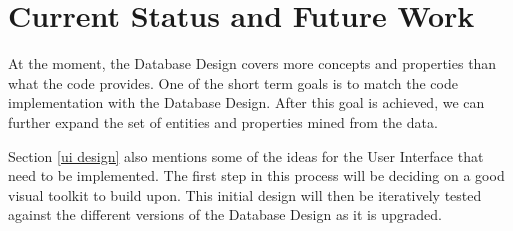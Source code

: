 \documentclass{sig-alternate}
\begin{document}
\section{Current Status and Future Work}
\label{current status}

At the moment, the Database Design covers more concepts and properties than what the code provides. One of the short
term goals is to match the code implementation with the Database Design. After this goal is achieved, we can further
expand the set of entities and properties mined from the data.

Section \ref{ui design} also mentions some of the ideas for the User Interface that need to be implemented. The first
step in this process will be deciding on a good visual toolkit to build upon. This initial design will then be
iteratively tested against the different versions of the Database Design as it is upgraded.



\balance
\end{document}
